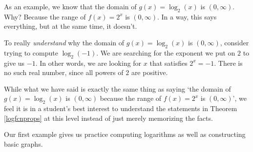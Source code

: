 \documentclass{ximera}
\begin{document}
\smallskip

As an example, we know that the domain of $g(x) = \log_{2}(x)$ is $(0,\infty)$.  Why?  Because the range of $f(x) = 2^{x}$ is $(0,\infty)$.  In a way, this says everything, but at the same time, it doesn't. 

\smallskip

To really \textit{understand} why the domain of $g(x) = \log_{2}(x)$ is $(0,\infty)$,  consider trying to compute $\log_{2}(-1)$.   We are searching for the exponent we put on $2$ to give us $-1$.  In other words, we are looking for $x$ that satisfies $2^{x} = -1$.  There is no such real number, since all powers of $2$ are positive. 

\smallskip

 While what we have said is exactly the same thing as saying `the domain of $g(x) = \log_{2}(x)$ is $(0,\infty)$ because the range of $f(x) = 2^{x}$ is $(0,\infty)$', we feel it is in a student's best interest to understand the statements in Theorem \ref{logfcnprops} at this level instead of just merely memorizing the facts.
 
\smallskip
 
 Our first example gives us practice computing logarithms as well as constructing basic graphs.
 
\newpage
\end{document}
